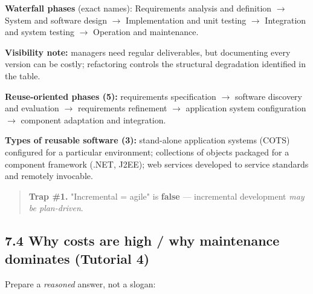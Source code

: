 \begin{studycolumns}
\vspace{0pt}

\textbf{Waterfall phases} (exact names): Requirements analysis and definition \ensuremath{\rightarrow} System and software design \ensuremath{\rightarrow} Implementation and unit testing \ensuremath{\rightarrow} Integration and system testing \ensuremath{\rightarrow} Operation and maintenance.


\textbf{Visibility note:} managers need regular deliverables, but documenting every version can be costly; refactoring controls the structural degradation identified in the table.

\textbf{Reuse-oriented phases (5):} requirements specification \ensuremath{\rightarrow} software discovery and evaluation \ensuremath{\rightarrow} requirements refinement \ensuremath{\rightarrow} application system configuration \ensuremath{\rightarrow} component adaptation and integration.

\textbf{Types of reusable software (3):} stand-alone application systems (COTS) configured for a particular environment; collections of objects packaged for a component framework (.NET, J2EE); web services developed to service standards and remotely invocable.


\begin{quote}\small\color{navy}
\textbf{Trap \#1.} "Incremental = agile" is \textbf{false} --- incremental development \emph{may be plan-driven}.


\end{quote}
\subsection*{7.4 Why costs are high /\allowbreak{} why maintenance dominates (Tutorial 4)}
Prepare a \emph{reasoned} answer, not a slogan:


\end{studycolumns}
